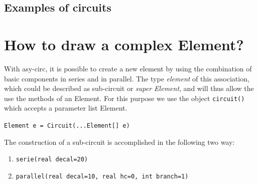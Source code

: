 \documentclass[10pt]{article}
\begin{document}
\subsection{Examples of circuits}
{}
\vspace{2cm}
{}
\newpage
{}
\vspace{2cm}
{}
\newpage
{}

\section{How to draw a complex Element?}
With asy-circ, it is possible to create a new element by using the combination of basic components in series and in parallel. The type \emph{element} of this association, which could be described as sub-circuit or \emph{super Element}, and will thus allow the use the methods of an Element.
For this purpose we use the object \verb|circuit()| which accepts a parameter list Element.\\
\begin{center}
\verb|Element e = Circuit(...Element[] e)|
\end{center}
The construction of a sub-circuit is accomplished in the following two way:\\
\begin{enumerate}
\item \verb|serie(real decal=20)|
\item \verb|parallel(real decal=10, real hc=0, int branch=1)|
\end{enumerate}
\end{document}

